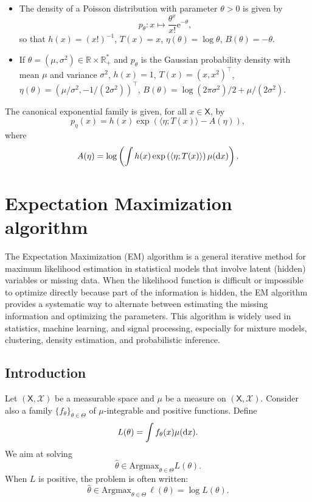 \documentclass[english,graybox,envcountchap,envcountsame,sectrefs,shortlabels]{svmono}
\theoremstyle{style}
\newcommand{\rme}{\mathrm{e}}
\newcommand{\eqsp}{}
\newcommand{\Xset}{\mathsf{X}}
\begin{document}
\begin{example}
\begin{itemize}
\item The density of a Poisson distribution with parameter $\theta>0$ is given by
$$
p_\theta:x \mapsto \frac{\theta^x}{x!} \rme^{-\theta}\eqsp,
$$
so that $h(x) = (x!)^{-1}$, $T(x)=x$, $\eta(\theta) = \log \theta$, $B(\theta) = -\theta$.
\item If $\theta = (\mu,\sigma^2)\in\mathbb{R}\times\mathbb{R}_+^*$ and $p_\theta$ is the Gaussian probability density with mean $\mu$ and variance $\sigma^2$, $h(x) = 1$, $T(x)=(x,x^2)^\top$, $\eta(\theta) = (\mu/\sigma^2,-1/(2\sigma^2))^\top$, $B(\theta) = \log(2\pi\sigma^2)/2 + \mu/(2\sigma^2)$.
\end{itemize}
\end{example}
The canonical exponential family is given, for all $x\in\Xset$, by 
$$
p_\eta(x) = h(x)\exp\left(\langle \eta;T(x)\rangle - A(\eta)\right)\eqsp,
$$
where
$$
A(\eta) = \log\left(\int h(x)\exp\left(\langle \eta;T(x)\rangle \right)\mu(\rmd x)\right)\eqsp.
$$

\chapter{Expectation Maximization algorithm}
The Expectation Maximization (EM) algorithm \cite{dempster1977maximum} is a general iterative method for maximum likelihood estimation in statistical models that involve latent (hidden) variables or missing data. When the likelihood function is difficult or impossible to optimize directly because part of the information is hidden, the EM algorithm provides a systematic way to alternate between estimating the missing information and optimizing the parameters. This algorithm is widely used in statistics, machine learning, and signal processing, especially for mixture models, clustering, density estimation, and probabilistic inference.
\section{Introduction}
Let $(\mathsf{X},\mathcal{X})$ be a measurable space and $\mu$ be a measure on $(\mathsf{X},\mathcal{X})$. Consider also a family $\{f_\theta\}_{\theta\in\Theta}$ of $\mu$-integrable and positive functions. Define
$$
L(\theta) = \int f_\theta(x)\mu(\rmd x)\eqsp.
$$
We aim at solving
$$
\widehat \theta \in\mathrm{Argmax}_{\theta\in\Theta} L(\theta)\eqsp.
$$
When $L$ is positive, the problem is often written:
$$
\widehat \theta \in\mathrm{Argmax}_{\theta\in\Theta} \,\ell(\theta) = \log L(\theta)\eqsp.
$$
\end{document}
